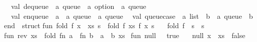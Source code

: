 \begin{isabellebody}
\begin{isamarkuptext}
\ \ val\ dequeue\ {}\ {}a\ queue\ {}{}\ {}a\ option\ {}\ {}a\ queue\isanewline
\ \ val\ enqueue\ {}\ {}a\ {}{}\ {}a\ queue\ {}{}\ {}a\ queue\isanewline
\ \ val\ queue{}case\ {}\ {}{}a\ list\ {}{}\ {}b{}\ {}{}\ {}a\ queue\ {}{}\ {}b\isanewline
end\ {}\ struct\isanewline
\isanewline
fun\ fold\ f\ {}x\ {}{}\ xs{}\ s\ {}\ fold\ f\ xs\ {}f\ x\ s{}\isanewline
\ \ {}\ fold\ f\ {}{}\ s\ {}\ s{}\isanewline
\isanewline
fun\ rev\ xs\ {}\ fold\ {}fn\ a\ {}{}\ fn\ b\ {}{}\ a\ {}{}\ b{}\ xs\ {}{}{}\isanewline
\isanewline
fun\ null\ {}{}\ {}\ true\isanewline
\ \ {}\ null\ {}x\ {}{}\ xs{}\ {}\ false{}\isanewline

\end{isamarkuptext}
\end{isabellebody}
